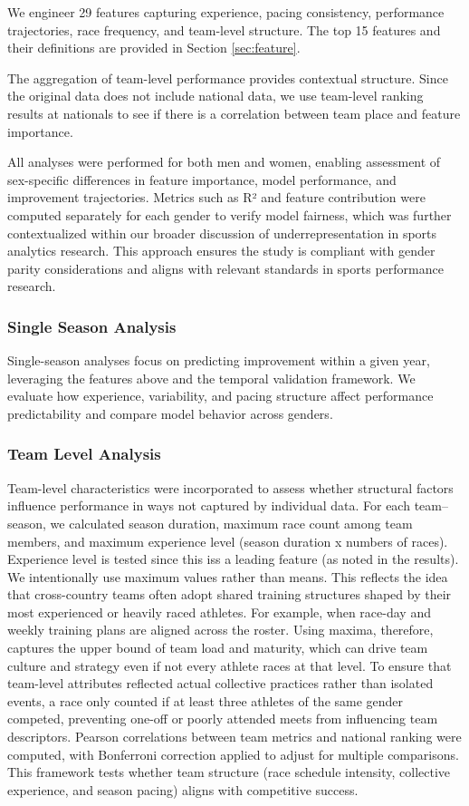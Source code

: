 \documentclass[suppldata]{interact}
\theoremstyle{plain}%
\theoremstyle{definition}
\theoremstyle{remark}
\begin{document}
We engineer 29 features capturing experience, pacing consistency, performance trajectories, race frequency, and team-level structure. The top 15 features and their definitions are provided in Section \ref{sec:feature}.

The aggregation of team-level performance provides contextual structure. Since the original data does not include national data, we use team-level ranking results at nationals to see if there is a correlation between team place and feature importance.

All analyses were performed for both men and women, enabling assessment of sex-specific differences in feature importance, model performance, and improvement trajectories. Metrics such as R² and feature contribution were computed separately for each gender to verify model fairness, which was further contextualized within our broader discussion of underrepresentation in sports analytics research. This approach ensures the study is compliant with gender parity considerations and aligns with relevant standards in sports performance research.

\subsubsection{Single Season Analysis}
Single-season analyses focus on predicting improvement within a given year, leveraging the features above and the temporal validation framework. We evaluate how experience, variability, and pacing structure affect performance predictability and compare model behavior across genders.

\subsubsection{Team Level Analysis}
Team-level characteristics were incorporated to assess whether structural factors influence performance in ways not captured by individual data. For each team–season, we calculated season duration, maximum race count among team members, and maximum experience level (season duration x numbers of races). Experience level is tested since this iss a leading feature (as noted in the results). We intentionally use maximum values rather than means. This reflects the idea that cross-country teams often adopt shared training structures shaped by their most experienced or heavily raced athletes. For example, when race-day and weekly training plans are aligned across the roster. Using maxima, therefore, captures the upper bound of team load and maturity, which can drive team culture and strategy even if not every athlete races at that level. To ensure that team-level attributes reflected actual collective practices rather than isolated events, a race only counted if at least three athletes of the same gender competed, preventing one-off or poorly attended meets from influencing team descriptors. Pearson correlations between team metrics and national ranking were computed, with Bonferroni correction \cite{cabin2000bonferroni} applied to adjust for multiple comparisons. This framework tests whether team structure (race schedule intensity, collective experience, and season pacing) aligns with competitive success.
\end{document}
